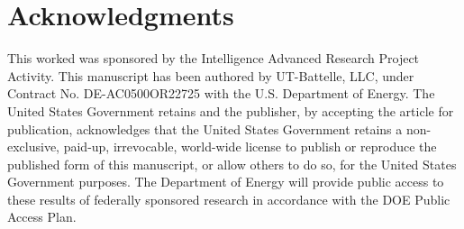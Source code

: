 \documentclass[twocolumn,pra]{revtex4}
\begin{document}
\section*{Acknowledgments}
This worked was sponsored by the Intelligence Advanced Research Project Activity. This manuscript has been authored by UT-Battelle, LLC, under Contract No. DE-AC0500OR22725 with the U.S. Department of Energy. The United States Government retains and the publisher, by accepting the article for publication, acknowledges that the United States Government retains a non-exclusive, paid-up, irrevocable, world-wide license to publish or reproduce the published form of this manuscript, or allow others to do so, for the United States Government purposes. The Department of Energy will provide public access to these results of federally sponsored research in accordance with the DOE Public Access Plan.


\appendix
\end{document}
